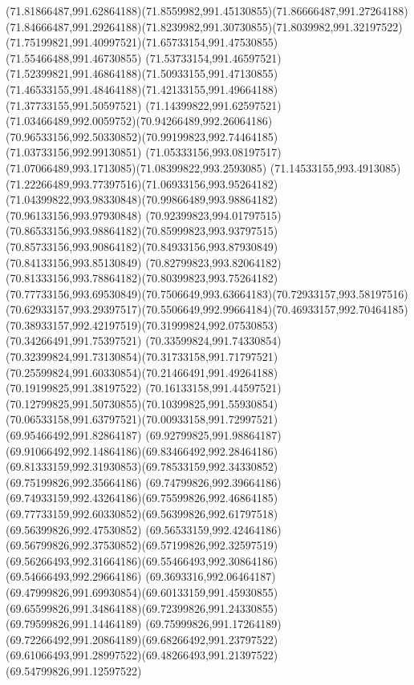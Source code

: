 {{	\curveto(71.81866487,991.62864188)(71.8559982,991.45130855)(71.86666487,991.27264188)
	\curveto(71.84666487,991.29264188)(71.8239982,991.30730855)(71.8039982,991.32197522)
	\curveto(71.75199821,991.40997521)(71.65733154,991.47530855)(71.55466488,991.46730855)
	\curveto(71.53733154,991.46597521)(71.52399821,991.46864188)(71.50933155,991.47130855)
	\curveto(71.46533155,991.48464188)(71.42133155,991.49664188)(71.37733155,991.50597521)
	\curveto(71.14399822,991.62597521)(71.03466489,992.0059752)(70.94266489,992.26064186)
	\curveto(70.96533156,992.50330852)(70.99199823,992.74464185)(71.03733156,992.99130851)
	\curveto(71.05333156,993.08197517)(71.07066489,993.1713085)(71.08399822,993.2593085)
	\curveto(71.14533155,993.4913085)(71.22266489,993.77397516)(71.06933156,993.95264182)
	\curveto(71.04399822,993.98330848)(70.99866489,993.98864182)(70.96133156,993.97930848)
	\curveto(70.92399823,994.01797515)(70.86533156,993.98864182)(70.85999823,993.93797515)
	\curveto(70.85733156,993.90864182)(70.84933156,993.87930849)(70.84133156,993.85130849)
	\curveto(70.82799823,993.82064182)(70.81333156,993.78864182)(70.80399823,993.75264182)
	\curveto(70.77733156,993.69530849)(70.7506649,993.63664183)(70.72933157,993.58197516)
	\curveto(70.62933157,993.29397517)(70.5506649,992.99664184)(70.46933157,992.70464185)
	\curveto(70.38933157,992.42197519)(70.31999824,992.07530853)(70.34266491,991.75397521)
	\curveto(70.33599824,991.74330854)(70.32399824,991.73130854)(70.31733158,991.71797521)
	\curveto(70.25599824,991.60330854)(70.21466491,991.49264188)(70.19199825,991.38197522)
	\curveto(70.16133158,991.44597521)(70.12799825,991.50730855)(70.10399825,991.55930854)
	\curveto(70.06533158,991.63797521)(70.00933158,991.72997521)(69.95466492,991.82864187)
	\curveto(69.92799825,991.98864187)(69.91066492,992.14864186)(69.83466492,992.28464186)
	\curveto(69.81333159,992.31930853)(69.78533159,992.34330852)(69.75199826,992.35664186)
	\curveto(69.74799826,992.39664186)(69.74933159,992.43264186)(69.75599826,992.46864185)
	\curveto(69.77733159,992.60330852)(69.56399826,992.61797518)(69.56399826,992.47530852)
	\curveto(69.56533159,992.42464186)(69.56799826,992.37530852)(69.57199826,992.32597519)
	\curveto(69.56266493,992.31664186)(69.55466493,992.30864186)(69.54666493,992.29664186)
	\curveto(69.3693316,992.06464187)(69.47999826,991.69930854)(69.60133159,991.45930855)
	\curveto(69.65599826,991.34864188)(69.72399826,991.24330855)(69.79599826,991.14464189)
	\curveto(69.75999826,991.17264189)(69.72266492,991.20864189)(69.68266492,991.23797522)
	\curveto(69.61066493,991.28997522)(69.48266493,991.21397522)(69.54799826,991.12597522)
}}
